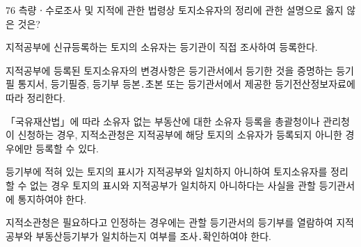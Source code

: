 \begin{question}{76}
측량ㆍ수로조사 및 지적에 관한 법령상 토지소유자의 정리에 관한 설명으로 옳지 않은 것은?
\begin{choices}
  \item 지적공부에 신규등록하는 토지의 소유자는 등기관이 직접 조사하여 등록한다.
  \item 지적공부에 등록된 토지소유자의 변경사항은 등기관서에서 등기한 것을 증명하는 등기필 통지서, 등기필증, 등기부 등본․초본 또는 등기관서에서 제공한 등기전산정보자료에 따라 정리한다.
  \item 「국유재산법」에 따라 소유자 없는 부동산에 대한 소유자 등록을 총괄청이나 관리청이 신청하는 경우, 지적소관청은 지적공부에 해당 토지의 소유자가 등록되지 아니한 경우에만 등록할 수 있다.
  \item 등기부에 적혀 있는 토지의 표시가 지적공부와 일치하지 아니하여 토지소유자를 정리할 수 없는 경우 토지의 표시와 지적공부가 일치하지 아니하다는 사실을 관할 등기관서에 통지하여야 한다.
  \item 지적소관청은 필요하다고 인정하는 경우에는 관할 등기관서의 등기부를 열람하여 지적공부와 부동산등기부가 일치하는지 여부를 조사․확인하여야 한다.
\end{choices}
\end{question}
